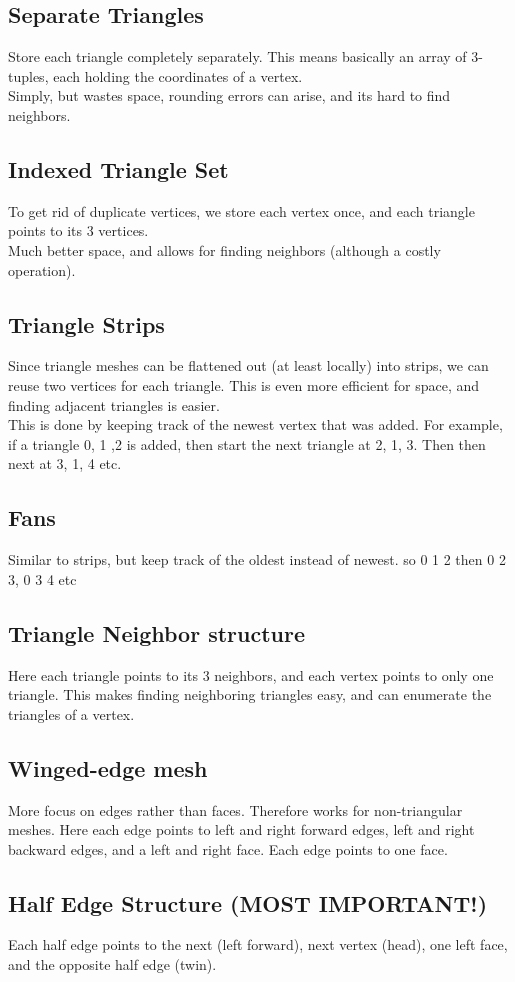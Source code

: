 \documentclass[12pt]{article}
\theoremstyle{definition}
\begin{document}
\subsection{Separate Triangles}
Store each triangle completely separately. This means basically an array of 3-tuples, each holding the coordinates of a vertex.
\\ \linebreak
Simply, but wastes space, rounding errors can arise, and its hard to find neighbors.
\subsection{Indexed Triangle Set}
To get rid of duplicate vertices, we store each vertex once, and each triangle points to its 3 vertices.
\\ \linebreak
Much better space, and allows for finding neighbors (although a costly operation).
\subsection{Triangle Strips}
Since triangle meshes can be flattened out (at least locally) into strips, we can reuse two vertices for each triangle. This is even more efficient for space, and finding adjacent triangles is easier.
\\ \linebreak
This is done by keeping track of the newest vertex that was added. For example, if a triangle 0, 1 ,2 is added, then start the next triangle at 2, 1, 3. Then then next at 3, 1, 4 etc. 
\subsection{Fans}
Similar to strips, but keep track of the oldest instead of newest.
so 0 1 2 then 0 2 3, 0 3 4 etc
\subsection{Triangle Neighbor structure}
Here each triangle points to its 3 neighbors, and each vertex points to only one triangle. This makes finding neighboring triangles easy, and can enumerate the triangles of a vertex.
\subsection{Winged-edge mesh}
More focus on edges rather than faces. Therefore works for non-triangular meshes. Here each edge points to left and right forward edges, left and right backward edges, and a left and right face. Each edge points to one face.
\\ \linebreak
\subsection{Half Edge Structure (MOST IMPORTANT!)}
Each half edge points to the next (left forward), next vertex (head), one left face, and the opposite half edge (twin).
\end{document}
